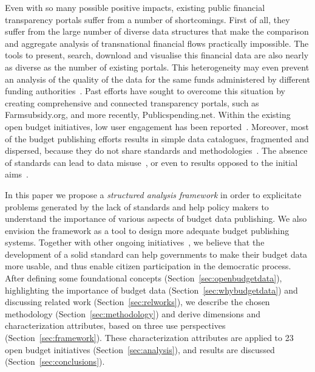 
Even with so many possible positive impacts, existing public financial transparency portals suffer from a number of shortcomings.
First of all, they suffer from the large number of diverse data structures that make the comparison and aggregate analysis of transnational financial flows practically impossible. 
The tools to present, search, download and visualise this financial data are also nearly as diverse as the number of existing portals. 
This heterogeneity may even prevent an analysis of the quality of the data for the same funds administered by different funding authorities~\cite{Vafopoulos2013}. 
Past efforts have sought to overcome this situation by creating comprehensive and connected transparency portals, such as Farmsubsidy.org, and more recently, Publicspending.net.
Within the existing open budget initiatives, low user engagement has been reported~\cite{Worthy2013}. 
Moreover, most of the budget publishing efforts results in simple data catalogues, fragmented and dispersed, because they do not share standards and methodologies~\cite{Vafopoulos2013}. 
The absence of standards can lead to data misuse~\cite{Zuiderwijk2014a}, or even to results opposed to the initial aims~\cite{Gurstein2011}.

In this paper we propose a \emph{structured analysis framework} in order to explicitate problems generated by the lack of standards and help policy makers to understand the importance of various aspects of budget data publishing. We also envision the framework as a tool to design more adequate budget publishing systems. Together with other ongoing initiatives~\cite{OpenSpending,Vlasov2014}, we believe that the development of a solid standard can help governments to make their budget data more usable, and thus enable citizen participation in the democratic process. After defining some foundational concepts (Section~\ref{sec:openbudgetdata}), highlighting the importance of budget data (Section~\ref{sec:whybudgetdata}) and discussing related work (Section~\ref{sec:relworks}), we describe the chosen methodology (Section~\ref{sec:methodology}) and derive dimensions and characterization attributes, based on three use perspectives (Section~\ref{sec:framework}).
These characterization attributes are applied to 23 open budget initiatives (Section~\ref{sec:analysis}), and results are discussed (Section~\ref{sec:conclusions}).


